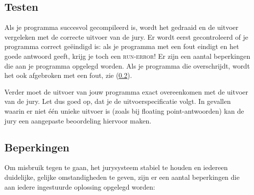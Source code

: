 \subsection{Testen}

Als je programma succesvol gecompileerd is, wordt het gedraaid en de
uitvoer vergeleken met de correcte uitvoer van de jury. Er wordt eerst
gecontroleerd of je programma correct ge\"eindigd is: als je programma
met een fout eindigt en het goede antwoord geeft, krijg je toch een
\textsc{run-error}! Er zijn een aantal beperkingen die aan je programma
opgelegd worden. Als je programma die overschrijdt, wordt het ook
afgebroken met een fout, zie (\ref{runlimits}).

Verder moet de uitvoer van jouw programma exact overeenkomen met de
uitvoer van de jury. Let dus goed op, dat je de uitvoerspecificatie
volgt. In gevallen waarin er niet \'e\'en unieke uitvoer is (zoals bij
floating point-antwoorden) kan de jury een aangepaste beoordeling
hiervoor maken.

\subsection{Beperkingen}\label{runlimits}

Om misbruik tegen te gaan, het jurysysteem stabiel te houden en iedereen
duidelijke, gelijke omstandigheden te geven, zijn er een aantal
beperkingen die aan iedere ingestuurde oplossing opgelegd worden:

